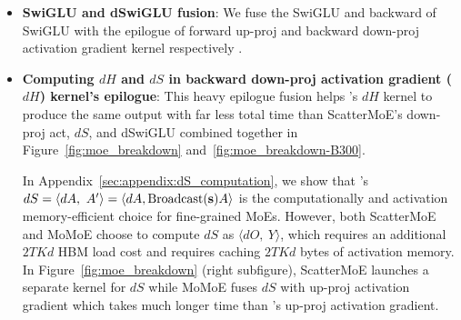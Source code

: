 \begin{itemize}
    \item \textbf{SwiGLU and dSwiGLU fusion}: We fuse the SwiGLU and backward of SwiGLU with the epilogue of forward up-proj and backward down-proj activation gradient kernel respectively \citep{costin2025momoe}. 
    
    
    \item \textbf{Computing $dH$ and $dS$ in backward down-proj activation gradient ($dH$) kernel's epilogue}: This heavy epilogue fusion helps \Algname's $dH$ kernel to produce the same output with far less total time than ScatterMoE's down-proj act, $dS$, and dSwiGLU combined together in Figure~\ref{fig:moe_breakdown} and~\ref{fig:moe_breakdown-B300}. 
    

    
    In Appendix~\ref{sec:appendix:dS_computation}, we show that \Algname's $dS = \langle dA, \ A'\rangle = \langle dA, \mathrm{Broadcast}({\mathbf{s}}) A\rangle$ is the computationally and activation memory-efficient choice for fine-grained MoEs. However, both ScatterMoE and MoMoE choose to compute $dS$ as $\langle dO, \ Y \rangle$, which requires an additional $2TKd$ HBM load cost and requires caching $2TKd$ bytes of activation memory. In Figure~\ref{fig:moe_breakdown} (right subfigure), ScatterMoE launches a separate kernel for $dS$ while MoMoE fuses $dS$ with up-proj activation gradient which takes much longer time than \Algname's up-proj activation gradient. 
    
    
    

\end{itemize}

